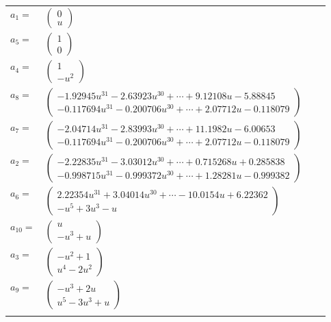 \documentclass[1p]{elsarticle_modified}
\theoremstyle{definition}
\begin{document}
\begin{tabular}{m{7pt} m{180pt} m{7pt} m{180pt} }
\flushright $a_{1}=$&$\begin{pmatrix}0\\u\end{pmatrix}$ \\
\flushright $a_{5}=$&$\begin{pmatrix}1\\0\end{pmatrix}$ \\
\flushright $a_{4}=$&$\begin{pmatrix}1\\- u^2\end{pmatrix}$ \\
\flushright $a_{8}=$&$\begin{pmatrix}-1.92945 u^{31}-2.63923 u^{30}+\cdots+9.12108 u-5.88845\\-0.117694 u^{31}-0.200706 u^{30}+\cdots+2.07712 u-0.118079\end{pmatrix}$ \\
\flushright $a_{7}=$&$\begin{pmatrix}-2.04714 u^{31}-2.83993 u^{30}+\cdots+11.1982 u-6.00653\\-0.117694 u^{31}-0.200706 u^{30}+\cdots+2.07712 u-0.118079\end{pmatrix}$ \\
\flushright $a_{2}=$&$\begin{pmatrix}-2.22835 u^{31}-3.03012 u^{30}+\cdots+0.715268 u+0.285838\\-0.998715 u^{31}-0.999372 u^{30}+\cdots+1.28281 u-0.999382\end{pmatrix}$ \\
\flushright $a_{6}=$&$\begin{pmatrix}2.22354 u^{31}+3.04014 u^{30}+\cdots-10.0154 u+6.22362\\- u^5+3 u^3- u\end{pmatrix}$ \\
\flushright $a_{10}=$&$\begin{pmatrix}u\\- u^3+u\end{pmatrix}$ \\
\flushright $a_{3}=$&$\begin{pmatrix}- u^2+1\\u^4-2 u^2\end{pmatrix}$ \\
\flushright $a_{9}=$&$\begin{pmatrix}- u^3+2 u\\u^5-3 u^3+u\end{pmatrix}$\\&\end{tabular}
\end{document}

